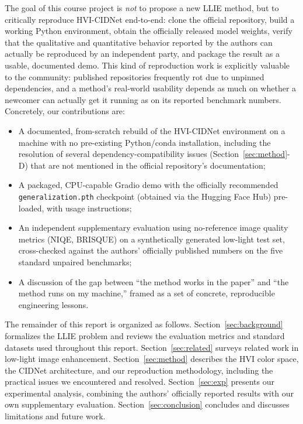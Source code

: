 \documentclass[conference]{IEEEtran}
\begin{document}
The goal of this course project is \emph{not} to propose a new LLIE method,
but to critically reproduce HVI-CIDNet end-to-end: clone the official
repository, build a working Python environment, obtain the officially
released model weights, verify that the qualitative and quantitative
behavior reported by the authors can actually be reproduced by an independent
party, and package the result as a usable, documented demo. This kind of
reproduction work is explicitly valuable to the community: published
repositories frequently rot due to unpinned dependencies, and a method's
real-world usability depends as much on whether a newcomer can actually get
it running as on its reported benchmark numbers. Concretely, our
contributions are:

\begin{itemize}
  \item A documented, from-scratch rebuild of the HVI-CIDNet environment on a
  machine with no pre-existing Python/conda installation, including the
  resolution of several dependency-compatibility issues (Section~\ref{sec:method}-D)
  that are not mentioned in the official repository's documentation;
  \item A packaged, CPU-capable Gradio demo with the officially recommended
  \texttt{generalization.pth} checkpoint (obtained via the Hugging Face Hub)
  pre-loaded, with usage instructions;
  \item An independent supplementary evaluation using no-reference image
  quality metrics (NIQE, BRISQUE) on a synthetically generated low-light test
  set, cross-checked against the authors' officially published numbers on the
  five standard unpaired benchmarks;
  \item A discussion of the gap between ``the method works in the paper'' and
  ``the method runs on my machine,'' framed as a set of concrete,
  reproducible engineering lessons.
\end{itemize}

The remainder of this report is organized as follows.
Section~\ref{sec:background} formalizes the LLIE problem and reviews the
evaluation metrics and standard datasets used throughout this report.
Section~\ref{sec:related} surveys related work in low-light image
enhancement. Section~\ref{sec:method} describes the HVI color space, the
CIDNet architecture, and our reproduction methodology, including the
practical issues we encountered and resolved. Section~\ref{sec:exp} presents
our experimental analysis, combining the authors' officially reported
results with our own supplementary evaluation. Section~\ref{sec:conclusion}
concludes and discusses limitations and future work.
\end{document}
